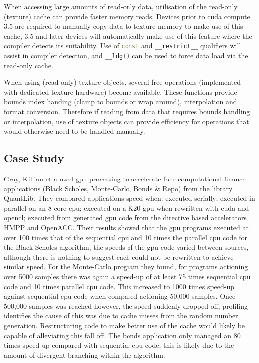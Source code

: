         When accessing large amounts of read-only data, utilisation of the read-only (texture) cache can provide faster memory reads. Devices prior to \gls{cuda} compute 3.5 are required to manually copy data to texture memory to make use of this cache, 3.5 and later devices will automatically make use of this feature where the compiler detects its suitability. Use of \lstinline[language={C++}]!const! and \lstinline[language={C++}]!__restrict__! qualifiers will assist in compiler detection, and \lstinline[language={C++}]!__ldg()! can be used to force data load via the read-only cache.

        When using (read-only) texture objects, several free operations (implemented with dedicated texture hardware) become available. These functions provide bounds index handing (clamp to bounds or wrap around), interpolation and format conversion. Therefore if reading from data that requires bounds handling or interpolation, use of texture objects can provide efficiency for operations that would otherwise need to be handled manually.
    \subsection{Case Study}
      Gray, Killian et a \cite{GK*13} used \gls{gpu} processing to accelerate four computational finance applications (Black Scholes, Monte-Carlo, Bonds \& Repo) from the library QuantLib. They compared applications speed when: executed serially; executed in parallel on an 8-core \gls{cpu}; executed on a K20 \gls{gpu} when rewritten with \gls{cuda} and \gls{opencl}; executed from generated \gls{gpu} code from the directive based accelerators HMPP and OpenACC. Their results showed that the \gls{gpu} programs executed at over 100 times that of the sequential \gls{cpu} and 10 times the parallel \gls{cpu} code for the Black Scholes algorithm, the speeds of the \gls{gpu} code varied between sources, although there is nothing to suggest each could not be rewritten to achieve similar speed. For the Monte-Carlo program they found, for programs actioning over 5000 samples there was again a speed-up of at least 75 times sequential \gls{cpu} code and 10 times parallel \gls{cpu} code. This increased to 1000 times speed-up against sequential \gls{cpu} code when compared actioning 50,000 samples. Once 500,000 samples was reached however, the speed suddenly dropped off, profiling identifies the cause of this was due to cache misses from the random number generation. Restructuring code to make better use of the cache would likely be capable of alleviating this fall off. The bonds application only managed an 80 times speed-up compared with sequential \gls{cpu} code, this is likely due to the amount of divergent branching within the algorithm.

